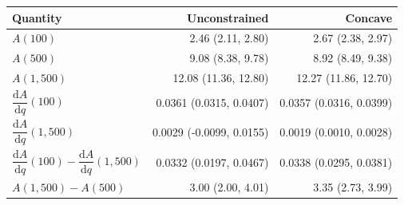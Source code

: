 \begin{tabular}{lrr}
\toprule
Quantity & Unconstrained & Concave \\
\midrule
$A(100)$ & 2.46 (2.11, 2.80) & 2.67 (2.38, 2.97) \\
\addlinespace[2pt]
$A(500)$ & 9.08 (8.38, 9.78) & 8.92 (8.49, 9.38) \\
\addlinespace[2pt]
$A(1{,}500)$ & 12.08 (11.36, 12.80) & 12.27 (11.86, 12.70) \\
\addlinespace[2pt]
$\dfrac{\mathrm{d}A}{\mathrm{d}q}(100)$ & 0.0361 (0.0315, 0.0407) & 0.0357 (0.0316, 0.0399) \\
\addlinespace[2pt]
$\dfrac{\mathrm{d}A}{\mathrm{d}q}(1{,}500)$ & 0.0029 (-0.0099, 0.0155) & 0.0019 (0.0010, 0.0028) \\
\addlinespace[2pt]
$\dfrac{\mathrm{d}A}{\mathrm{d}q}(100)-\dfrac{\mathrm{d}A}{\mathrm{d}q}(1{,}500)$ & 0.0332 (0.0197, 0.0467) & 0.0338 (0.0295, 0.0381) \\
\addlinespace[2pt]
$A(1{,}500)-A(500)$ & 3.00 (2.00, 4.01) & 3.35 (2.73, 3.99) \\
\bottomrule
\end{tabular}

